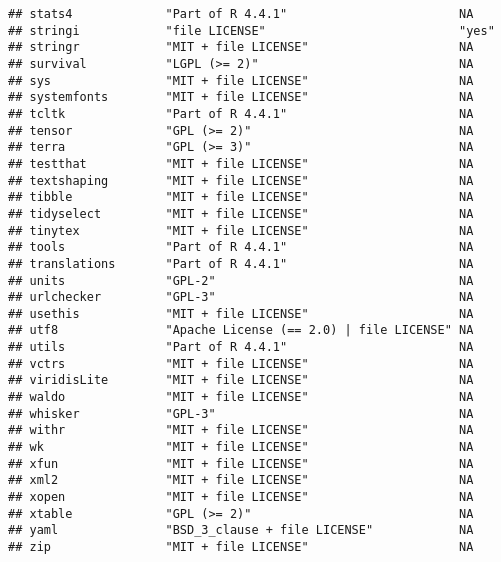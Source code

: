 \documentclass[
]{article}
\begin{document}
\begin{verbatim}
## stats4             "Part of R 4.4.1"                        NA             
## stringi            "file LICENSE"                           "yes"          
## stringr            "MIT + file LICENSE"                     NA             
## survival           "LGPL (>= 2)"                            NA             
## sys                "MIT + file LICENSE"                     NA             
## systemfonts        "MIT + file LICENSE"                     NA             
## tcltk              "Part of R 4.4.1"                        NA             
## tensor             "GPL (>= 2)"                             NA             
## terra              "GPL (>= 3)"                             NA             
## testthat           "MIT + file LICENSE"                     NA             
## textshaping        "MIT + file LICENSE"                     NA             
## tibble             "MIT + file LICENSE"                     NA             
## tidyselect         "MIT + file LICENSE"                     NA             
## tinytex            "MIT + file LICENSE"                     NA             
## tools              "Part of R 4.4.1"                        NA             
## translations       "Part of R 4.4.1"                        NA             
## units              "GPL-2"                                  NA             
## urlchecker         "GPL-3"                                  NA             
## usethis            "MIT + file LICENSE"                     NA             
## utf8               "Apache License (== 2.0) | file LICENSE" NA             
## utils              "Part of R 4.4.1"                        NA             
## vctrs              "MIT + file LICENSE"                     NA             
## viridisLite        "MIT + file LICENSE"                     NA             
## waldo              "MIT + file LICENSE"                     NA             
## whisker            "GPL-3"                                  NA             
## withr              "MIT + file LICENSE"                     NA             
## wk                 "MIT + file LICENSE"                     NA             
## xfun               "MIT + file LICENSE"                     NA             
## xml2               "MIT + file LICENSE"                     NA             
## xopen              "MIT + file LICENSE"                     NA             
## xtable             "GPL (>= 2)"                             NA             
## yaml               "BSD_3_clause + file LICENSE"            NA             
## zip                "MIT + file LICENSE"                     NA             

\end{verbatim}
\end{document}
